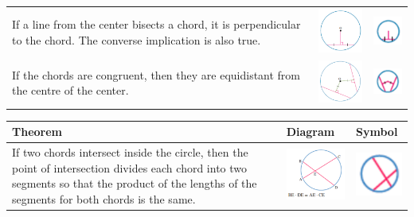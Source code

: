 \documentclass[a4paper,10pt]{report}
\begin{document}
\begin{center}
\begin{tabular}[center]{p{5cm}|p{3cm}|p{2cm}}
		If a line from the center bisects a chord, it is perpendicular to the chord.  The converse implication is also true. & \includegraphics[width=3cm]{circle theorem 4} & \includegraphics[width=2cm]{circle theorem 4 symbol} \\
		If the chords are congruent, then they are equidistant from the centre of the center.                                & \includegraphics[width=3cm]{circle theorem 5} & \includegraphics[width=2cm]{circle theorem 5 symbol} \\
	\end{tabular}
	\begin{tabular}[center]{p{5cm}|p{3cm}|p{2cm}}
		Theorem                                                                                                                                                                                        & Diagram                                        & Symbol                                                \\ \hline
		If two chords intersect inside the circle, then the point of intersection divides each chord into two segments so that the product of the lengths of the segments for both chords is the same. & \includegraphics[width=3cm]{circle theorem 6}  & \includegraphics[width=2cm]{circle theorem 6 symbol}  \\

\end{tabular}
\end{center}
\end{document}
